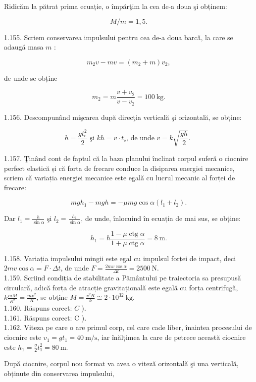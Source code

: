 Ridicăm la pătrat prima ecuație, o împărţim la cea de-a doua şi obținem:

$$
M / m=1,5 .
$$

1.155. Scriem conservarea impulsului pentru cea de-a doua barcă, la care se adaugă masa $m$ :

$$
m_{2} v-m v=\left(m_{2}+m\right) v_{2},
$$

de unde se obține

$$
m_{2}=m \frac{v+v_{2}}{v-v_{2}}=100 \mathrm{~kg} .
$$

1.156. Descompunând mişcarea după direcţia verticală şi orizontală, se obține:

$$
h=\frac{g t_{\mathrm{c}}^{2}}{2} \text { şi } k h=v \cdot t_{\mathrm{c}} \text {, de unde } v=k \sqrt{\frac{g h}{2}} \text {. }
$$

1.157. Ţinând cont de faptul că la baza planului înclinat corpul suferă o ciocnire perfect elastică și că forta de frecare conduce la disiparea energiei mecanice, scriem că variația energiei mecanice este egală cu lucrul mecanic al forței de frecare:

$$
m g h_{1}-m g h=-\mu m g \cos \alpha\left(l_{1}+l_{2}\right) .
$$

Dar $l_{1}=\frac{h}{\sin \alpha}$ şi $l_{2}=\frac{h_{1}}{\sin \alpha}$, de unde, înlocuind în ecuația de mai sus, se obține:

$$
h_{1}=h \frac{1-\mu \operatorname{ctg} \alpha}{1+\mu \operatorname{ctg} \alpha}=8 \mathrm{~m} .
$$

1.158. Variația impulsului mingii este egal cu impulsul forței de impact, deci $2 m v \cos \alpha=F \cdot \Delta t$, de unde $F=\frac{2 m v \cos \alpha}{\Delta t}=2500 \mathrm{~N}$.\\
1.159. Scriind condiția de stabilitate a Pământului pe traiectoria sa presupusă circulară, adică forța de atracție gravitațională este egală cu forța centrifugă, $k \frac{m M}{R^{2}}=\frac{m v^{2}}{R}$, se obţine $M=\frac{v^{2} R}{k} \cong 2 \cdot 10^{32} \mathrm{~kg}$.\\
1.160. Răspuns corect: $C$ ).\\
1.161. Răspuns corect: C ).\\
1.162. Viteza pe care o are primul corp, cel care cade liber, înaintea procesului de ciocnire este $v_{1}=g t_{1}=40 \mathrm{~m} / \mathrm{s}$, iar înălțimea la care de petrece această ciocnire este $h_{1}=\frac{g}{2} t_{1}^{2}=80 \mathrm{~m}$.

După ciocnire, corpul nou format va avea o viteză orizontală şi una verticală, obținute din conservarea impulsului,

